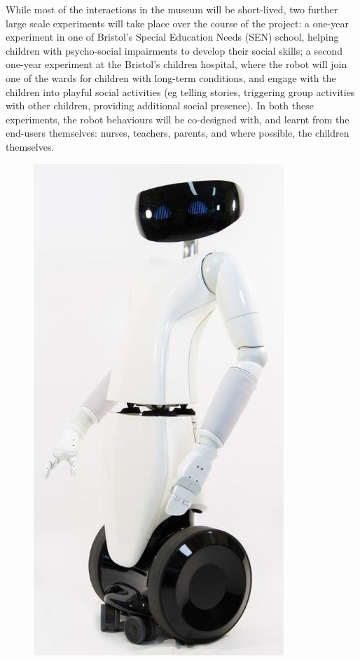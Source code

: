 \documentclass[11pt,a4paper]{report}
\begin{document}
While most of the interactions in the museum will be short-lived, two further
large scale experiments will take place over the course of the project: a
one-year experiment in one of Bristol's Special Education Needs (SEN) school,
helping children with psycho-social impairments to develop their social skills;
a second one-year  experiment at the Bristol's children hospital, where the
robot will join one of the wards for children with long-term conditions, and
engage with the children into playful social activities (eg telling stories,
triggering group activities with other children, providing additional social
presence). In both these experiments, the robot behaviours will be co-designed
with, and learnt from the end-users themselves: nurses, teachers, parents, and
where possible, the children themselves.


\begin{figure}
    \centering
    \includegraphics[width=\linewidth]{R1-profile}

\end{figure}
\end{document}
